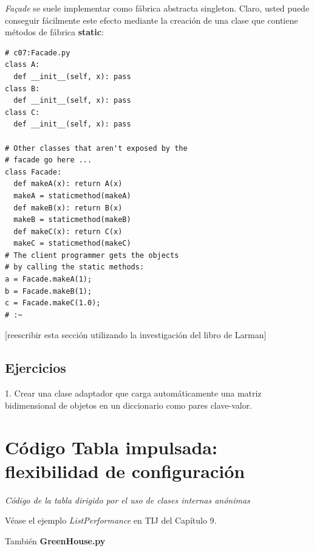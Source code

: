 \documentclass{article}
\begin{document}
\textit{Façade} se suele implementar como fábrica abstracta singleton. Claro, usted puede conseguir fácilmente este efecto mediante la creación de una clase que contiene métodos de fábrica \textbf{static}:  \newline

\begin{lstlisting} 
# c07:Facade.py 
class A: 
  def __init__(self, x): pass 
class B: 
  def __init__(self, x): pass 
class C: 
  def __init__(self, x): pass 
  
# Other classes that aren't exposed by the 
# facade go here ... 
class Facade: 
  def makeA(x): return A(x) 
  makeA = staticmethod(makeA) 
  def makeB(x): return B(x) 
  makeB = staticmethod(makeB) 
  def makeC(x): return C(x) 
  makeC = staticmethod(makeC) 
# The client programmer gets the objects 
# by calling the static methods: 
a = Facade.makeA(1); 
b = Facade.makeB(1); 
c = Facade.makeC(1.0); 
# :~ 
\end{lstlisting}
[reescribir esta sección utilizando la investigación del libro de Larman]   \newline

\subsection{Ejercicios}

1. Crear una clase adaptador que carga automáticamente una matriz bidimensional de objetos en un diccionario como pares clave-valor.

\newpage

\section{\texorpdfstring{Código Tabla impulsada: \newline flexibilidad de configuración}{Código Tabla impulsada: flexibilidad de configuración}}

\textit{Código de la tabla dirigido por el uso de clases internas anónimas}

Véase  el ejemplo \textit{ListPerformance} en TIJ del Capítulo 9.   \newline

También \textbf{GreenHouse.py}
\end{document}
